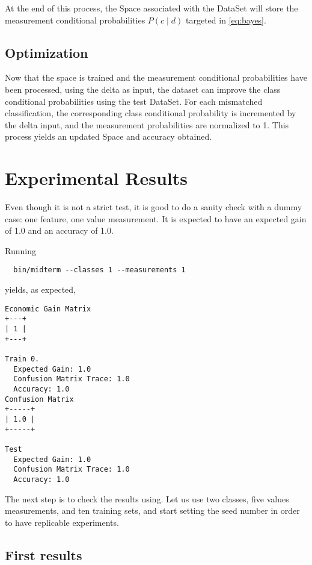 \documentclass[letterpaper, conference]{IEEEtran}
\begin{document}
At the end of this process, the Space associated with the DataSet will store the measurement conditional probabilities $P(c \mid d)$ targeted in \ref{eq:bayes}.

\subsection{Optimization}

Now that the space is trained and the measurement conditional probabilities have been processed, using the delta as input, the dataset can improve the class conditional probabilities using the test DataSet. For each mismatched classification, the corresponding class conditional probability is incremented by the delta input, and the measurement probabilities are normalized to 1. This process yields an updated Space and accuracy obtained.

\section{Experimental Results}

Even though it is not a strict test, it is good to do a sanity check with a dummy case: one feature, one value measurement. It is expected to have an expected gain of 1.0 and an accuracy of 1.0.

Running

\begin{verbatim}
  bin/midterm --classes 1 --measurements 1
\end{verbatim}

yields, as expected,

\begin{verbatim}
Economic Gain Matrix
+---+
| 1 |
+---+

Train 0.
  Expected Gain: 1.0
  Confusion Matrix Trace: 1.0
  Accuracy: 1.0
Confusion Matrix
+-----+
| 1.0 |
+-----+

Test
  Expected Gain: 1.0
  Confusion Matrix Trace: 1.0
  Accuracy: 1.0
\end{verbatim}


The next step is to check the results using. Let us use two classes, five values measurements, and ten training sets, and start setting the seed number in order to have replicable experiments.

\subsection{First results}
\end{document}
